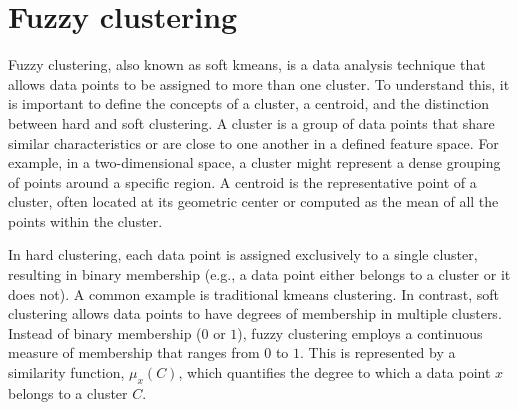 \section{Fuzzy clustering}
\begin{modified}
	Fuzzy clustering, also known as soft \gls{kmeans}, is a data analysis technique that allows data points to be assigned to more than one cluster. To understand this, it is important to define the concepts of a cluster, a centroid, and the distinction between hard and soft clustering. A cluster is a group of data points that share similar characteristics or are close to one another in a defined feature space. For example, in a two-dimensional space, a cluster might represent a dense grouping of points around a specific region. A centroid is the representative point of a cluster, often located at its geometric center or computed as the mean of all the points within the cluster.

	\noindent In hard clustering, each data point is assigned exclusively to a single cluster, resulting in binary membership (e.g., a data point either belongs to a cluster or it does not). A common example is traditional \gls{kmeans} clustering. In contrast, soft clustering allows data points to have degrees of membership in multiple clusters. Instead of binary membership ($0$ or $1$), fuzzy clustering employs a continuous measure of membership that ranges from $0$ to $1$. This is represented by a similarity function, $\mu_x(C)$, which quantifies the degree to which a data point $x$ belongs to a cluster $C$.
\end{modified}

